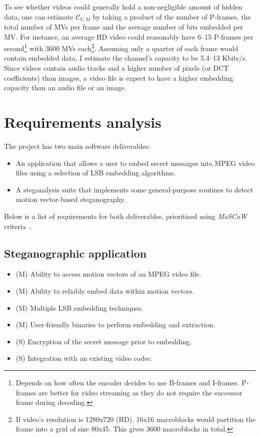 \documentclass[12pt,british,twoside,notitlepage,usenames,dvipsnames,hypens,final]{report}
\numberwithin{equation}{section}
\numberwithin{figure}{section}
\begin{document}
To see whether videos could generally hold a non-negligible amount of hidden data, one can estimate $\mathcal{C}_{V, M}$ by taking a product of the number of P-frames, the total number of MVs per frame and the average number of bits embedded per MV. For instance, an average HD video could reasonably have 6--15 P-frames per second\footnote{Depends on how often the encoder decides to use B-frames and I-frames. P-frames are better for video streaming as they do not require the successor frame during decoding.} with 3600 MVs each\footnote{If video's resolution is 1280x720 (HD), 16x16 macroblocks would partition the frame into a grid of size 80x45. This gives 3600 macroblocks in total.}. Assuming only a quarter of each frame would contain embedded data, I estimate the channel's capacity to be 5.4--13 Kbits/s. Since videos contain audio tracks and a higher number of pixels (or DCT coefficients) than images, a video file is expect to have a higher embedding capacity than an audio file or an image.

\section{Requirements analysis}

The project has two main software deliverables:
\begin{itemize}
\item  An application that allows a user to embed secret messages into MPEG video files using a selection of LSB embedding algorithms.
\item A steganalysis suite that implements some general-purpose routines to detect motion vector-based steganography.
\end{itemize}

Below is a list of requirements for both deliverables, prioritised using \emph{MoSCoW} criteria~\cite{softid-notes}.

\subsection{Steganographic application}
\label{req-steg-app}
\begin{itemize}
\item (M) Ability to access motion vectors of an MPEG video file.
\item (M) Ability to reliably embed data within motion vectors.
\item (M) Multiple LSB embedding techniques.
\item (M) User-friendly binaries to perform embedding and extraction.
\item (S) Encryption of the secret message prior to embedding.
\item (S) Integration with an existing video codec.
\end{itemize}
\end{document}
